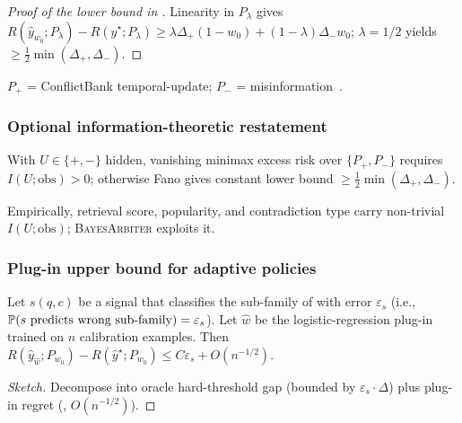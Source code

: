 \begin{proof}[Proof of the lower bound in ]
Linearity in $P_\lambda$ gives
$R(\hat y_{w_0};P_\lambda)\!-\!R(\hat y^\star;P_\lambda)\!\ge\!\lambda\Delta_+(1\!-\!w_0)\!+\!(1\!-\!\lambda)\Delta_-w_0$;
$\lambda\!=\!1/2$ yields $\ge\tfrac12\min(\Delta_+,\Delta_-)$.
\end{proof}

\begin{remark}[Realisability]
\label{rmk:thm2-realizable}
$P_+$ = ConflictBank temporal-update; $P_-$ =
misinformation~\citep{su2024conflictbank}.
\end{remark}

\subsubsection{Optional information-theoretic restatement}
\label{app:thm2-fano}

\begin{proposition}
\label{prop:thm2-fano}
With $U\!\in\!\{+,-\}$ hidden, vanishing minimax excess risk over
$\{P_+,P_-\}$ requires $I(U;\text{obs})\!>\!0$; otherwise Fano
gives constant lower bound $\ge\tfrac12\min(\Delta_+,\Delta_-)$.
\end{proposition}

Empirically, retrieval score, popularity, and contradiction type
carry non-trivial $I(U;\text{obs})$; \textsc{BayesArbiter} exploits it.

\subsubsection{Plug-in upper bound for adaptive policies}
\label{app:thm2-upper}

\begin{lemma}
\label{lem:thm2-upper}
Let $s(q,c)$ be a signal that classifies the sub-family of
 with error $\varepsilon_s$ (i.e.,
$\mathbb{P}(s\textup{ predicts wrong sub-family})=\varepsilon_s$).  Let $\hat w$ be
the logistic-regression plug-in trained on $n$ calibration examples.  Then
$R(\hat y_{\hat w};P_{w_0})-R(\hat y^\star;P_{w_0})\leq C\varepsilon_s+O(n^{-1/2})$.
\end{lemma}

\begin{proof}[Sketch]
Decompose into oracle hard-threshold gap (bounded by
$\varepsilon_s\cdot\Delta$) plus plug-in regret
(, $O(n^{-1/2})$).
\end{proof}

